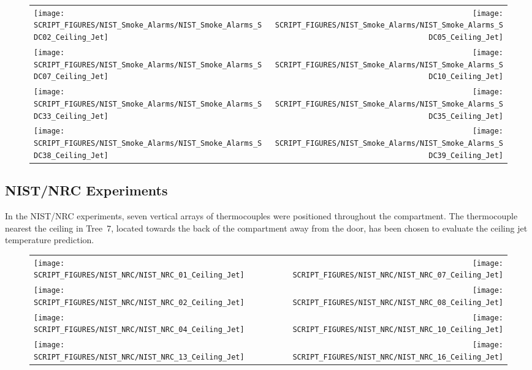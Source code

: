 \begin{figure}[h!]
\begin{tabular*}{\textwidth}{l@{\extracolsep{\fill}}r}
\texttt{[image: SCRIPT\_FIGURES/NIST\_Smoke\_Alarms/NIST\_Smoke\_Alarms\_SDC02\_Ceiling\_Jet]} &
\texttt{[image: SCRIPT\_FIGURES/NIST\_Smoke\_Alarms/NIST\_Smoke\_Alarms\_SDC05\_Ceiling\_Jet]} \\
\texttt{[image: SCRIPT\_FIGURES/NIST\_Smoke\_Alarms/NIST\_Smoke\_Alarms\_SDC07\_Ceiling\_Jet]} &
\texttt{[image: SCRIPT\_FIGURES/NIST\_Smoke\_Alarms/NIST\_Smoke\_Alarms\_SDC10\_Ceiling\_Jet]} \\
\texttt{[image: SCRIPT\_FIGURES/NIST\_Smoke\_Alarms/NIST\_Smoke\_Alarms\_SDC33\_Ceiling\_Jet]} &
\texttt{[image: SCRIPT\_FIGURES/NIST\_Smoke\_Alarms/NIST\_Smoke\_Alarms\_SDC35\_Ceiling\_Jet]} \\
\texttt{[image: SCRIPT\_FIGURES/NIST\_Smoke\_Alarms/NIST\_Smoke\_Alarms\_SDC38\_Ceiling\_Jet]} &
\texttt{[image: SCRIPT\_FIGURES/NIST\_Smoke\_Alarms/NIST\_Smoke\_Alarms\_SDC39\_Ceiling\_Jet]}
\end{tabular*}
\label{NIST_Smoke_Alarms_Ceiling_Jet}
\end{figure}


\clearpage

\subsection{NIST/NRC Experiments}

In the NIST/NRC experiments, seven vertical arrays of thermocouples were positioned throughout the compartment.
The thermocouple nearest the ceiling in Tree~7, located towards the back of the compartment away from the door,
has been chosen to evaluate the ceiling jet temperature prediction.

\newpage

\begin{figure}[p]
\begin{tabular*}{\textwidth}{l@{\extracolsep{\fill}}r}
\texttt{[image: SCRIPT\_FIGURES/NIST\_NRC/NIST\_NRC\_01\_Ceiling\_Jet]} &
\texttt{[image: SCRIPT\_FIGURES/NIST\_NRC/NIST\_NRC\_07\_Ceiling\_Jet]} \\
\texttt{[image: SCRIPT\_FIGURES/NIST\_NRC/NIST\_NRC\_02\_Ceiling\_Jet]} &
\texttt{[image: SCRIPT\_FIGURES/NIST\_NRC/NIST\_NRC\_08\_Ceiling\_Jet]} \\
\texttt{[image: SCRIPT\_FIGURES/NIST\_NRC/NIST\_NRC\_04\_Ceiling\_Jet]} &
\texttt{[image: SCRIPT\_FIGURES/NIST\_NRC/NIST\_NRC\_10\_Ceiling\_Jet]} \\
\texttt{[image: SCRIPT\_FIGURES/NIST\_NRC/NIST\_NRC\_13\_Ceiling\_Jet]} &
\texttt{[image: SCRIPT\_FIGURES/NIST\_NRC/NIST\_NRC\_16\_Ceiling\_Jet]}
\end{tabular*}
\label{NIST_NRC_Jet_Closed}
\end{figure}


